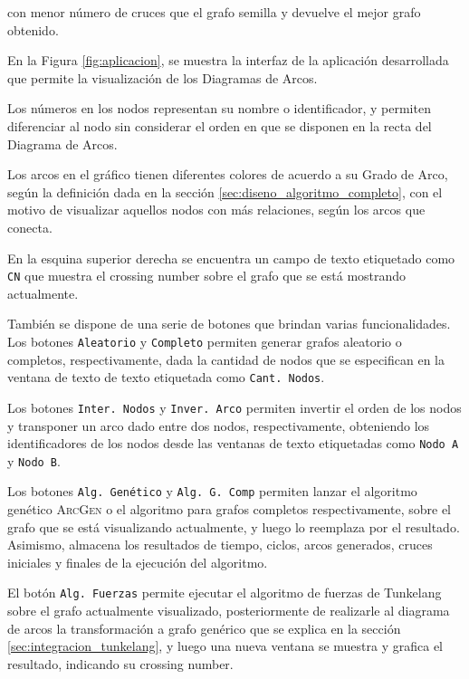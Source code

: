 \noindent con menor número de cruces que el grafo semilla y devuelve el mejor grafo obtenido.
	
En la  Figura \ref{fig:aplicacion}, se muestra la interfaz  de la aplicación desarrollada  que permite la visualización de los Diagramas de Arcos.

Los números en los nodos representan su nombre o identificador,  y permiten diferenciar al nodo sin considerar el orden en que se disponen en la recta del Diagrama de Arcos.

Los arcos en el gráfico tienen diferentes colores de acuerdo a su Grado de Arco, según la definición dada en la sección \ref{sec:diseno_algoritmo_completo}, con el motivo de visualizar aquellos nodos con más relaciones, según los arcos que conecta.

En la esquina superior derecha se encuentra un campo de texto etiquetado como \texttt{CN} que muestra el crossing number sobre el grafo que se está mostrando actualmente.



También se dispone de una serie de botones que brindan varias funcionalidades. Los botones \texttt{Aleatorio} y \texttt{Completo} permiten generar grafos aleatorio o completos, respectivamente, dada la cantidad de nodos que se especifican en la ventana de texto de texto etiquetada como \texttt{Cant. Nodos}. 

Los botones \texttt{Inter. Nodos} y \texttt{Inver. Arco} permiten invertir el orden de los nodos y transponer un arco dado entre dos nodos, respectivamente, obteniendo los identificadores de los nodos desde las ventanas de texto etiquetadas como \texttt{Nodo A} y \texttt{Nodo B}. 

Los botones \texttt{Alg. Genético} y \texttt{Alg. G. Comp} permiten lanzar el algoritmo genético \textsc{ArcGen} o el algoritmo para grafos completos respectivamente, sobre el grafo que se está visualizando actualmente, y luego lo reemplaza por el resultado. Asimismo,  almacena los resultados de tiempo, ciclos, arcos generados, cruces iniciales y finales de la ejecución del algoritmo.

El botón \texttt{Alg. Fuerzas} permite ejecutar el algoritmo de fuerzas de Tunkelang sobre el grafo actualmente visualizado, posteriormente de realizarle al diagrama de arcos la transformación a grafo genérico que se explica en la sección \ref{sec:integracion_tunkelang}, y luego una nueva ventana se muestra y grafica el resultado, indicando su crossing number.

